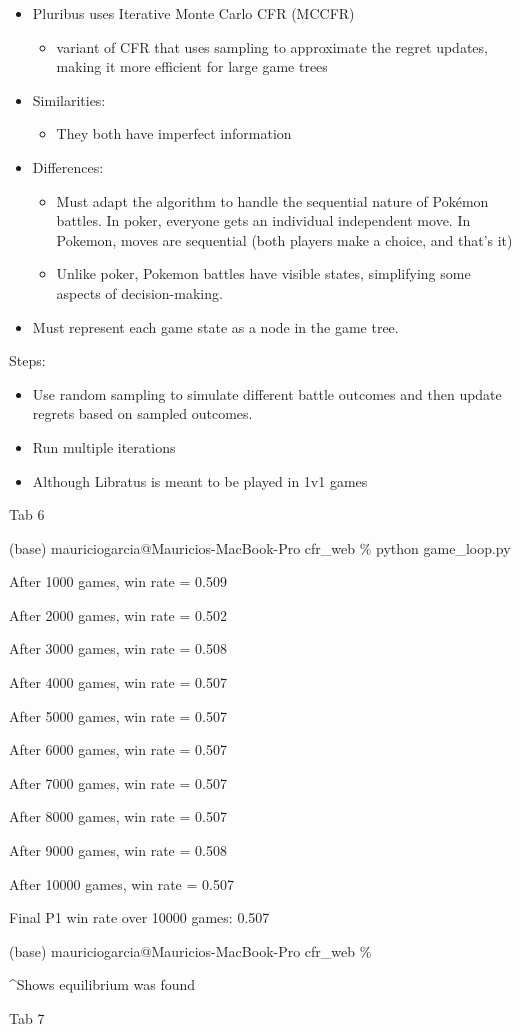 \documentclass[
]{article}
\begin{document}
\begin{itemize}
\item
  Pluribus uses Iterative Monte Carlo CFR (MCCFR)

  \begin{itemize}
  \item
    variant of CFR that uses sampling to approximate the regret updates,
    making it more efficient for large game trees
  \end{itemize}
\item
  Similarities:

  \begin{itemize}
  \item
    They both have imperfect information
  \end{itemize}
\item
  Differences:

  \begin{itemize}
  \item
    Must adapt the algorithm to handle the sequential nature of Pokémon
    battles. In poker, everyone gets an individual independent move. In
    Pokemon, moves are sequential (both players make a choice, and
    that's it)
  \item
    Unlike poker, Pokemon battles have visible states, simplifying some
    aspects of decision-making.
  \end{itemize}
\item
  Must represent each game state as a node in the game tree.
\end{itemize}

Steps:

\begin{itemize}
\item
  Use random sampling to simulate different battle outcomes and then
  update regrets based on sampled outcomes.
\item
  Run multiple iterations
\item
  Although Libratus is meant to be played in 1v1 games
\end{itemize}

Tab 6

(base) mauriciogarcia@Mauricios-MacBook-Pro cfr\_web \% python
game\_loop.py

After 1000 games, win rate = 0.509

After 2000 games, win rate = 0.502

After 3000 games, win rate = 0.508

After 4000 games, win rate = 0.507

After 5000 games, win rate = 0.507

After 6000 games, win rate = 0.507

After 7000 games, win rate = 0.507

After 8000 games, win rate = 0.507

After 9000 games, win rate = 0.508

After 10000 games, win rate = 0.507

Final P1 win rate over 10000 games: 0.507

(base) mauriciogarcia@Mauricios-MacBook-Pro cfr\_web \%

\^{}Shows equilibrium was found

Tab 7
\end{document}
